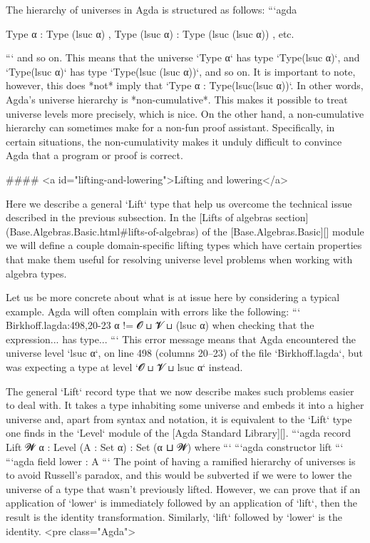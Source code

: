 The hierarchy of universes in Agda is structured as follows:
```agda

Type α : Type (lsuc α) ,   Type (lsuc α) : Type (lsuc (lsuc α)) , etc.

```
and so on. This means that the universe `Type α` has type `Type(lsuc α)`, and
`Type(lsuc α)` has type `Type(lsuc (lsuc α))`, and so on.  It is important to
note, however, this does *not* imply that  `Type α : Type(lsuc(lsuc α))`. In other
words, Agda's universe hierarchy is *non-cumulative*. This makes it possible to
treat universe levels more precisely, which is nice. On the other hand, a
non-cumulative hierarchy can sometimes make for a non-fun proof assistant.
Specifically, in certain situations, the non-cumulativity makes it unduly
difficult to convince Agda that a program or proof is correct.


#### <a id="lifting-and-lowering">Lifting and lowering</a>

Here we describe a general `Lift` type that help us overcome the technical issue
described in the previous subsection.  In the [Lifts of algebras
section](Base.Algebras.Basic.html#lifts-of-algebras) of the
[Base.Algebras.Basic][] module we will define a couple domain-specific lifting
types which have certain properties that make them useful for resolving universe
level problems when working with algebra types.

Let us be more concrete about what is at issue here by considering a typical
example. Agda will often complain with errors like the following:
```
Birkhoff.lagda:498,20-23
α != 𝓞 ⊔ 𝓥 ⊔ (lsuc α) when checking that the expression... has type...
```
This error message means that Agda encountered the universe level `lsuc α`, on
line 498 (columns 20--23) of the file `Birkhoff.lagda`, but was expecting a type
at level `𝓞 ⊔ 𝓥 ⊔ lsuc α` instead. 

The general `Lift` record type that we now describe makes such problems easier to
deal with. It takes a type inhabiting some universe and embeds it into a higher
universe and, apart from syntax and notation, it is equivalent to the `Lift` type
one finds in the `Level` module of the [Agda Standard Library][].
```agda
record Lift {𝓦 α : Level} (A : Set α) : Set (α ⊔ 𝓦) where
```
```agda
    constructor lift
```
```agda
    field lower : A
```
The point of having a ramified hierarchy of universes is to avoid Russell's
paradox, and this would be subverted if we were to lower the universe of a type
that wasn't previously lifted.  However, we can prove that if an application of
`lower` is immediately followed by an application of `lift`, then the result is
the identity transformation. Similarly, `lift` followed by `lower` is the
identity.
<pre class="Agda">

